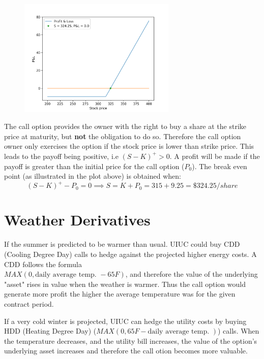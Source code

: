 \documentclass{article}
\begin{document}
\begin{figure}[H]
	\centering
	\includegraphics[width=75mm]{pl.png}
\end{figure}
The call option provides the owner with the right to buy a share at the strike price at maturity, but \textbf{not} the obligation to do so. Therefore the call option owner only exercises the option if the stock price is lower than strike price. This leads to the payoff being positive, i.e $(S-K)^+ > 0$. A profit will be made if the payoff is greater than the initial price for the call option ($P_0$). The break even point (as illustrated in the plot above) is obtained when: 
$$(S-K)^+ - P_0 = 0 \implies S = K + P_0 = 315 + 9.25 = \$ 324.25 / share$$

\section{Weather Derivatives}

If the summer is predicted to be warmer than usual. UIUC could buy CDD (Cooling Degree Day) calls to hedge against the projected higher energy costs. A CDD follows the formula \\ 
$MAX(0, \text{daily average temp. } - 65 F)$, and therefore the value of the underlying "asset" rises in value when the weather is warmer. Thus the call option would generate more profit the higher the average temperature was for the given contract period.

If a very cold winter is projected, UIUC can hedge the utility costs by buying HDD (Heating Degree Day) ($MAX(0, 65F - \text{daily average temp. })$) calls. When the temperature decreases, and the utility bill increases, the value of the option's underlying asset increases and therefore the call otion becomes more valuable.
\end{document}

